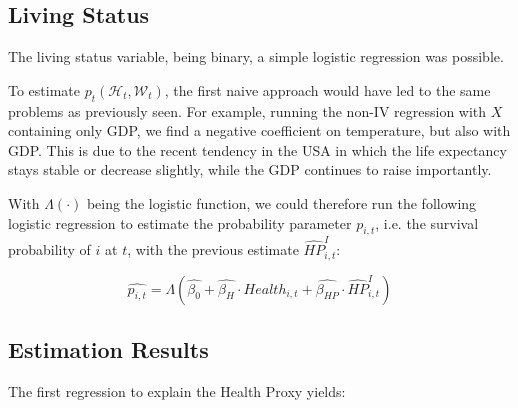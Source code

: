 \documentclass{article}
\begin{document}
\subsection{Living Status}

The living status variable, being binary, 
a simple logistic regression was possible. 


To estimate $p_{t}(\mathcal{H}_{t},\mathcal{W}_{t})$,
the first naive approach would have led to the same 
problems as previously seen.
For example, running the non-IV regression with $X$ containing only GDP, 
we find a negative coefficient on temperature, but also with GDP. 
This is due to the recent tendency in the USA in which the life expectancy stays 
stable or decrease slightly, while the GDP continues to raise importantly.

With $\Lambda(\cdot)$ being the logistic
function, we could therefore run the following logistic regression 
to estimate the probability parameter $p_{i,t}$, i.e. the
survival probability of $i$ at $t$,
with the previous estimate $\widehat{HP}_{i,t}^{I}$: 


\begin{equation}
    \widehat{p_{i,t}} = \Lambda \left( \widehat{\beta_0} +
    \widehat{\beta_{H}} \cdot Health_{i,t} +
    \widehat{\beta_{HP}} \cdot \widehat{HP}_{i,t}^{I}\right)
\end{equation}

\subsection{Estimation Results}

The first regression to explain the Health Proxy yields: 
\end{document}
